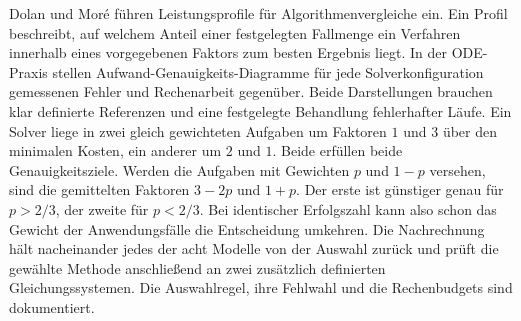 Dolan und Moré führen Leistungsprofile für Algorithmenvergleiche ein. Ein Profil beschreibt, auf welchem Anteil einer festgelegten Fallmenge ein Verfahren innerhalb eines vorgegebenen Faktors zum besten Ergebnis liegt. In der ODE-Praxis stellen Aufwand-Genauigkeits-Diagramme für jede Solverkonfiguration gemessenen Fehler und Rechenarbeit gegenüber. Beide Darstellungen brauchen klar definierte Referenzen und eine festgelegte Behandlung fehlerhafter Läufe.
Ein Solver liege in zwei gleich gewichteten Aufgaben um Faktoren \(1\) und \(3\) über den minimalen Kosten, ein anderer um \(2\) und \(1\). Beide erfüllen beide Genauigkeitsziele. Werden die Aufgaben mit Gewichten \(p\) und \(1-p\) versehen, sind die gemittelten Faktoren \(3-2p\) und \(1+p\). Der erste ist günstiger genau für \(p>2/3\), der zweite für \(p<2/3\). Bei identischer Erfolgszahl kann also schon das Gewicht der Anwendungsfälle die Entscheidung umkehren.
Die Nachrechnung hält nacheinander jedes der acht Modelle von der Auswahl zurück und prüft die gewählte Methode anschließend an zwei zusätzlich definierten Gleichungssystemen. Die Auswahlregel, ihre Fehlwahl und die Rechenbudgets sind dokumentiert.

